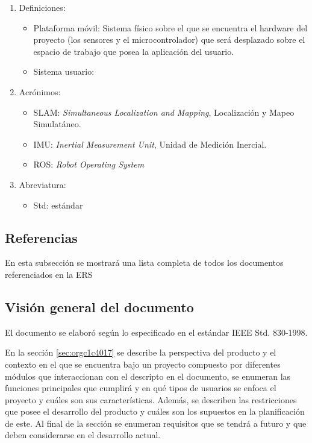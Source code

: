 \documentclass[12pt,a4paper, twosite]{article}
\begin{document}
\begin{enumerate}
  \item Definiciones:
  \begin{itemize}
    \item Plataforma móvil: Sistema físico sobre el que se encuentra el hardware del proyecto
    (los sensores y el microcontrolador) que será desplazado sobre el espacio de trabajo que posea
    la aplicación del usuario.
    \item Sistema usuario:
  \end{itemize}
  \item Acrónimos:
  \begin{itemize}
    \item SLAM: \textit{Simultaneous Localization and Mapping}, Localización y Mapeo Simulatáneo.
    \item IMU: \textit{Inertial Measurement Unit}, Unidad de Medición Inercial.
    \item ROS: \textit{Robot Operating System}
  \end{itemize}
  \item Abreviatura:
  \begin{itemize}
    \item Std: estándar
  \end{itemize}
\end{enumerate}


\subsection{Referencias}
\label{sec:org62711e0}

En esta subsección se mostrará una lista completa de todos los
documentos referenciados en la ERS


\subsection{Visión general del documento}
\label{sec:orgdaca22c}


El documento se elaboró según lo especificado en el estándar IEEE Std. 830-1998.

En la sección \ref{sec:orgc1c4017} se describe la perspectiva del producto y el contexto
en el que se encuentra bajo un proyecto compuesto por diferentes módulos que interaccionan con
el descripto en el documento, se enumeran las funciones principales que cumplirá y en qué tipos
de usuarios se enfoca el proyecto y cuáles son sus características. Además, se describen las
restricciones que posee el desarrollo del producto y cuáles son los supuestos en la
planificación de este. Al final de la sección se enumeran requisitos que se tendrá a futuro y
que deben considerarse en el desarrollo actual.
\end{document}
